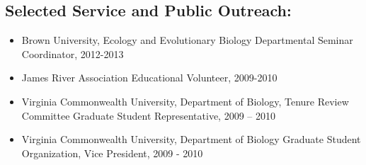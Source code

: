 \subsection*{Selected Service and Public Outreach:}\label{departmental-service-and-public-outreach}

\begin{itemize}
\tightlist
\item
  Brown University, Ecology and Evolutionary Biology Departmental
  Seminar Coordinator, 2012-2013
\item
  James River Association Educational Volunteer, 2009-2010
\item
  Virginia Commonwealth University, Department of Biology, Tenure Review
  Committee Graduate Student Representative, 2009 -- 2010
\item
  Virginia Commonwealth University, Department of Biology Graduate
  Student Organization, Vice President, 2009 - 2010
\end{itemize}

